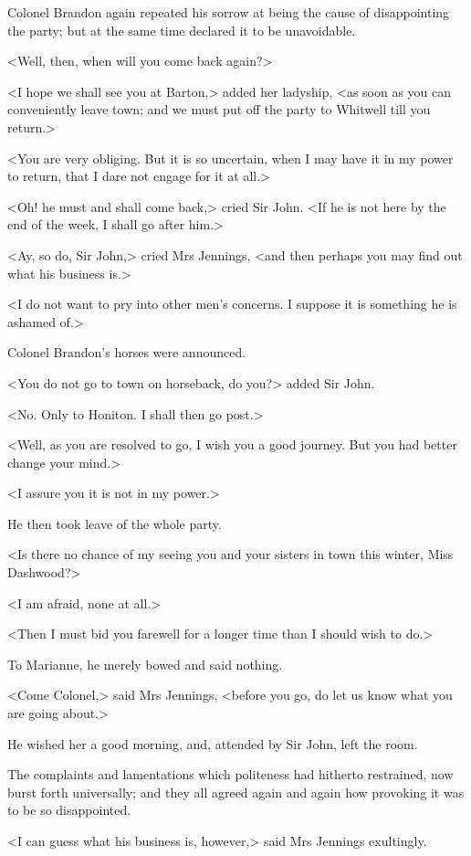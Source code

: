 Colonel Brandon again repeated his sorrow at being the cause of disappointing the party; but at the same time declared it to be unavoidable.

<Well, then, when will you come back again?>

<I hope we shall see you at Barton,> added her ladyship, <as soon as you can conveniently leave town; and we must put off the party to Whitwell till you return.>

<You are very obliging. But it is so uncertain, when I may have it in my power to return, that I dare not engage for it at all.>

<Oh! he must and shall come back,> cried Sir John. <If he is not here by the end of the week, I shall go after him.>

<Ay, so do, Sir John,> cried Mrs Jennings, <and then perhaps you may find out what his business is.>

<I do not want to pry into other men's concerns. I suppose it is something he is ashamed of.>

Colonel Brandon's horses were announced.

<You do not go to town on horseback, do you?> added Sir John.

<No. Only to Honiton. I shall then go post.>

<Well, as you are resolved to go, I wish you a good journey. But you had better change your mind.>

<I assure you it is not in my power.>

He then took leave of the whole party.

<Is there no chance of my seeing you and your sisters in town this winter, Miss Dashwood?>

<I am afraid, none at all.>

<Then I must bid you farewell for a longer time than I should wish to do.>

To Marianne, he merely bowed and said nothing.

<Come Colonel,> said Mrs Jennings, <before you go, do let us know what you are going about.>

He wished her a good morning, and, attended by Sir John, left the room.

The complaints and lamentations which politeness had hitherto restrained, now burst forth universally; and they all agreed again and again how provoking it was to be so disappointed.

<I can guess what his business is, however,> said Mrs Jennings exultingly.

